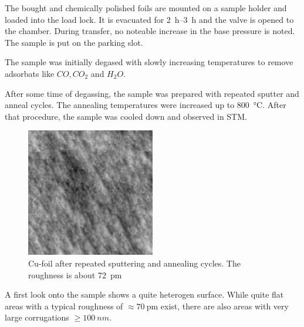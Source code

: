 The bought and chemically polished foils are mounted on a sample holder and loaded into the load lock. It is evacuated for \SIrange{2}{3}{\hour} and the valve is opened to the chamber. During transfer, no noteable increase in the base pressure is noted. The sample is put on the parking slot.

The sample was initially degased with slowly increasing temperatures to remove adsorbats like $CO, CO_2$ and $H_2O$.

After some time of degassing, the sample was prepared with repeated sputter and anneal cycles. The annealing temperatures were increased up to \SI{800}{\degreeCelsius}. 
After that procedure, the sample was cooled down and observed in STM.

\begin{figure}[h!]
 \centering
 \includegraphics[width=0.5\textwidth]{./images/F150331-125720.jpg}
 \caption{Cu-foil after repeated sputtering and annealing cycles. The roughness is about \SI{72}{\pico\meter}}
 \label{fig:cu-foil-clean}
\end{figure}

A first look onto the sample shows a quite heterogen surface. While quite flat areas with a typical roughness of $\approx \SI{70}{\pico\meter}$ exist, there are also areas with very large corrugations $\geq \SI{100}{nm}$.